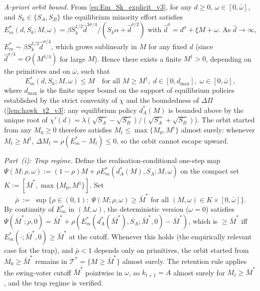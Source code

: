 \documentclass[11pt,twoside]{extarticle}
\begin{document}
\emph{A-priori orbit bound.} From \eqref{eq:Em_Sk_explicit_v3}, for any $d\ge 0$, $\omega\in[0,\bar\omega]$, and $S_k\in\{S_A,S_B\}$ the equilibrium minority effort satisfies
$E_m^*(d,S_k;M,\omega)=\beta S_k^{1/2}\hat d^{3\sigma/4}/(S_k\alpha+\hat d^{\sigma/2})$
with $\hat d^\sigma=d^\sigma+\xi M+\omega$. As $\hat d\to\infty$, $E_m^*\sim\beta S_k^{1/2}\hat d^{\sigma/4}$, which grows sublinearly in $M$ for any fixed $d$ (since $\hat d^{\sigma/4}=O(M^{1/4})$ for large $M$). Hence there exists a finite $M^\dagger>0$, depending on the primitives and on $\bar\omega$, such that
\begin{equation}\label{eq:orbit_bound_v3}
E_m^*(d,S_k;M,\omega)\le M\quad\text{for all }M\ge M^\dagger,\;d\in[0,d_{\max}],\;\omega\in[0,\bar\omega],
\end{equation}
where $d_{\max}$ is the finite upper bound on the support of equilibrium policies established by the strict convexity of $\chi$ and the boundedness of $\Delta\Pi$ (\autoref{lem:hawk_t2_v3}: any equilibrium policy $d_A^*(M)$ is bounded above by the unique root of $\chi'(d)=\lambda(\sqrt{S_A}-\sqrt{S_B})/(\sqrt{S_A}+\sqrt{S_B})$). The orbit started from any $M_0\ge 0$ therefore satisfies $M_t\le\max\{M_0,M^\dagger\}$ almost surely: whenever $M_t\ge M^\dagger$, $\Delta M_t=\rho(E_m^*-M_t)\le 0$, so the orbit cannot escape upward.

\emph{Part~(i): Trap regime.} Define the realisation-conditional one-step map $\Psi(M;\rho,\omega):=(1-\rho)M+\rho E_m^*(d_A^*(M),S_A;M,\omega)$ on the compact set $K:=[\bar M^*,\max\{M_0,M^\dagger\}]$. Set
\[
\bar\rho\;:=\;\sup\{\rho\in(0,1):\;\Psi(M;\rho,\omega)\ge\bar M^*\text{ for all }(M,\omega)\in K\times[0,\bar\omega]\}.
\]
By continuity of $E_m^*$ in $(M,\omega)$, the deterministic version ($\omega=0$) satisfies $\Psi(\bar M^*;\rho,0)=\bar M^*+\rho(E_m^*(d_A^*(\bar M^*),S_A;\bar M^*,0)-\bar M^*)$, which is $\ge\bar M^*$ iff $E_m^*(\cdot;\bar M^*,0)\ge\bar M^*$ at the cutoff. Whenever this holds (the empirically relevant case for the trap), and $\bar\rho<1$ depends only on primitives, the orbit started from $M_0\ge\bar M^*$ remains in $\mathcal T^*=\{M\ge\bar M^*\}$ almost surely. The retention rule applies the swing-voter cutoff $\bar M^*$ pointwise in $\omega$, so $k_{t+1}=A$ almost surely for $M_t\ge\bar M^*$, and the trap regime is verified.
\end{document}
